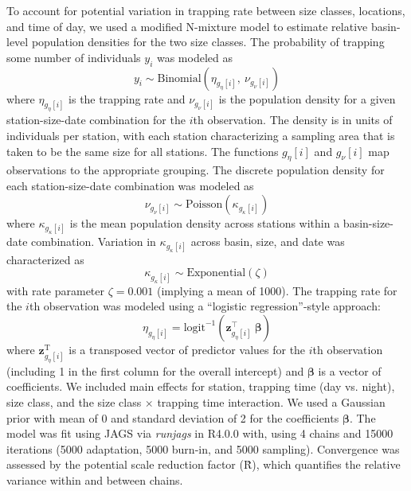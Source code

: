 \documentclass[11pt]{article}
\begin{document}
To account for potential variation in trapping rate between size classes,
locations, and time of day, 
we used a modified N-mixture model to estimate relative basin-level population densities
for the two size classes.
The probability of trapping some number of individuals $y_i$ 
was modeled as
%
\begin{equation}
  y_i \sim \text{Binomial}\left(\eta_{g_{\eta}[i]}, ~\nu_{g_{\nu}[i]}\right)
\end{equation}
%
where $\eta_{g_{\eta}[i]}$ is the trapping rate 
and $\nu_{g_{\nu}[i]}$ is the population density for a given 
station-size-date combination for the $i$th observation.
The density is in units of individuals per station, 
with each station characterizing a sampling area that is 
taken to be the same size for all stations.
The functions ${g_{\eta}[i]}$ and ${g_{\nu}[i]}$ map observations to the 
appropriate grouping. 
The discrete population density for each station-size-date combination was modeled as
%
\begin{equation}
  \nu_{g_{\nu}[i]} \sim \text{Poisson}\left(\kappa_{g_{\kappa}[i]}\right)
\end{equation}
%
where $\kappa_{g_{\kappa}[i]}$ is the mean population density across stations 
within a basin-size-date combination. 
Variation in $\kappa_{g_{\kappa}[i]}$ across basin, size, 
and date was characterized as 
%
\begin{equation}
  \kappa_{g_{\kappa}[i]} \sim 
    \text{Exponential}\left(\zeta \right)
\end{equation}
%
with rate parameter $\zeta = 0.001$ (implying a mean of 1000).
The trapping rate for the $i$th observation was modeled using a 
``logistic regression''-style approach:
%
\begin{equation}
  \eta_{g_{\eta}[i]} = 
    \text{logit}^{-1}\left(\mathbf{z}_{g_{\eta}[i]}^\top~{\boldsymbol\beta}\right)
\end{equation}
%
\noindent where $\mathbf{z}_{g_{\eta}[i]}^\text{T}$ is a transposed vector 
of predictor values for the $i$th observation
(including 1 in the first column for the overall intercept)
and $\boldsymbol\beta$ is a vector of coefficients. 
We included main effects for station, trapping time (day vs. night), size class,
and the size class $\times$ trapping time interaction.
We used a Gaussian prior with mean of 0 and standard deviation of 2 
for the coefficients $\boldsymbol\beta$.
The model was fit using JAGS via \emph{runjags} in R4.0.0 with,
using 4 chains and 15000 iterations (5000 adaptation, 5000 burn-in, and 5000 sampling).
Convergence was assessed by the potential scale reduction factor (\^{R}),
which quantifies the relative variance within and between chains. 
\end{document}
